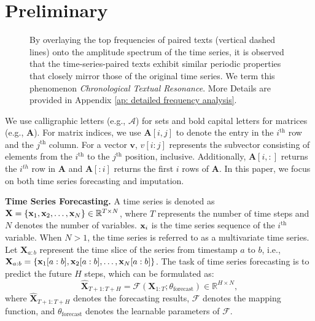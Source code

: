 \section{Preliminary}

\begin{figure*}[t]
\centering
{}
\caption{By overlaying the top frequencies of paired texts (vertical dashed lines) onto the amplitude spectrum of the time series, it is observed that the time-series-paired texts exhibit similar periodic properties that closely mirror those of the original time series. We term this phenomenon \textit{Chronological Textual Resonance}. More Details are provided in Appendix \ref{ap: detailed frequency analysis}.}
\label{fig: fft results with text marks}
\end{figure*}

We use calligraphic letters (e.g., $\mathcal{A}$) for sets and bold capital letters for matrices (e.g., $\bm{A}$). For matrix indices, we use $\bm{A}[i, j]$ to denote the entry in the $i^{\textrm{th}}$ row and the $j^{\textrm{th}}$ 
column. For a vector $\bm{v}$, $v[i:j]$ 
represents the subvector consisting of elements from the $i^{\textrm{th}}$ to the $j^{\textrm{th}}$ position, inclusive. Additionally, $\bm{A}[i, :]$ returns the $i^{th}$ row in $\bm{A}$ and $\bm{A}[:i]$ returns the first $i$ rows of $\bm{A}$. In this paper, we focus on both time series forecasting and imputation.

\textbf{Time Series Forecasting.} 
A time series is denoted as $\mathbf{X} = \{ \mathbf{x}_1, \mathbf{x}_2, \dots, \mathbf{x}_N \} \in \mathbb{R}^{T \times N}$, where $T$ represents the number of time steps and $N$ denotes the number of variables. $\mathbf{x}_i$ is the time series sequence of the $i^{\textrm{th}}$ variable. When $N > 1$, the time series is referred to as a multivariate time series. Let $\mathbf{X}_{a:b}$ represent the time slice of the series from timestamp $a$ to $b$, i.e., $\mathbf{X}_{a:b} = \{\mathbf{x}_1[a:b], \mathbf{x}_2[a:b], \dots, \mathbf{x}_N[a:b]\}$.
The task of time series forecasting is to predict the future $H$ steps, which can be formulated as:
\begin{equation}
\widehat{\mathbf{X}}_{T+1: T+H}=\mathcal{F}\left(\mathbf{X}_{1: T} ; \theta_{\text{forecast}}\right) \in \mathbb{R}^{H \times N},
\end{equation}
where $\widehat{\mathbf X}_{T+1:T+H}$ denotes the forecasting results, $\mathcal{F}$ denotes the mapping function, and $\theta_{\text{forecast}}$ denotes the learnable parameters of $\mathcal{F}$.

